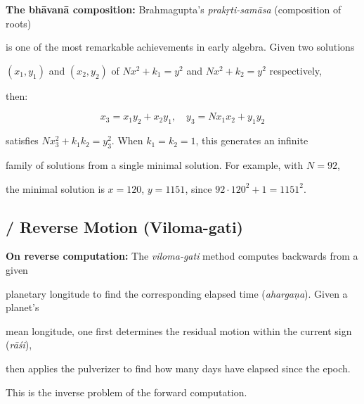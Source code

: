 \documentclass[10pt,a4paper]{article}
\newenvironment{engcommentary}
\newcommand{\bilingualverse}[2]{%

\noindent\begin{minipage}[t]{0.47\textwidth}

\dev{#1}

\end{minipage}%

\hfill\vline\hfill%

\begin{minipage}[t]{0.47\textwidth}

#2

\end{minipage}\par\vspace{0.8em}%

}
\begin{document}
\begin{engcommentary}

\textbf{The bhāvanā composition:} Brahmagupta's \textit{prakṛti-samāsa} (composition of roots)

is one of the most remarkable achievements in early algebra. Given two solutions

$(x_1, y_1)$ and $(x_2, y_2)$ of $Nx^2 + k_1 = y^2$ and $Nx^2 + k_2 = y^2$ respectively,

then:

\[

x_3 = x_1 y_2 + x_2 y_1, \quad y_3 = N x_1 x_2 + y_1 y_2

\]

satisfies $Nx_3^2 + k_1 k_2 = y_3^2$. When $k_1 = k_2 = 1$, this generates an infinite

family of solutions from a single minimal solution. For example, with $N = 92$,

the minimal solution is $x = 120$, $y = 1151$, since $92 \cdot 120^2 + 1 = 1151^2$.

\end{engcommentary}



\subsection*{ / Reverse Motion (Viloma-gati)}






\begin{engcommentary}

\textbf{On reverse computation:} The \textit{viloma-gati} method computes backwards from a given

planetary longitude to find the corresponding elapsed time (\textit{ahargaṇa}). Given a planet's

mean longitude, one first determines the residual motion within the current sign (\textit{rāśi}),

then applies the pulverizer to find how many days have elapsed since the epoch.

This is the inverse problem of the forward computation.

\end{engcommentary}
\end{document}
